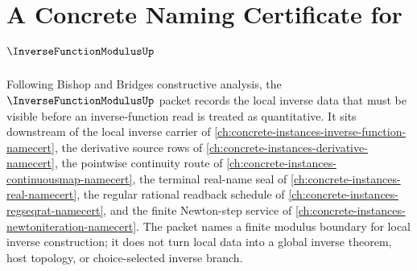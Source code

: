\chapter{A Concrete Naming Certificate for $\InverseFunctionModulusUp$}
\label{ch:concrete-instances-inverse-function-modulus-namecert}

Following Bishop and Bridges constructive analysis, the $\InverseFunctionModulusUp$ packet records the local inverse data that must be visible before an inverse-function read is treated as quantitative. It sits downstream of the local inverse carrier of \autoref{ch:concrete-instances-inverse-function-namecert}, the derivative source rows of \autoref{ch:concrete-instances-derivative-namecert}, the pointwise continuity route of \autoref{ch:concrete-instances-continuousmap-namecert}, the terminal real-name seal of \autoref{ch:concrete-instances-real-namecert}, the regular rational readback schedule of \autoref{ch:concrete-instances-regseqrat-namecert}, and the finite Newton-step service of \autoref{ch:concrete-instances-newtoniteration-namecert}. The packet names a finite modulus boundary for local inverse construction; it does not turn local data into a global inverse theorem, host topology, or choice-selected inverse branch.

